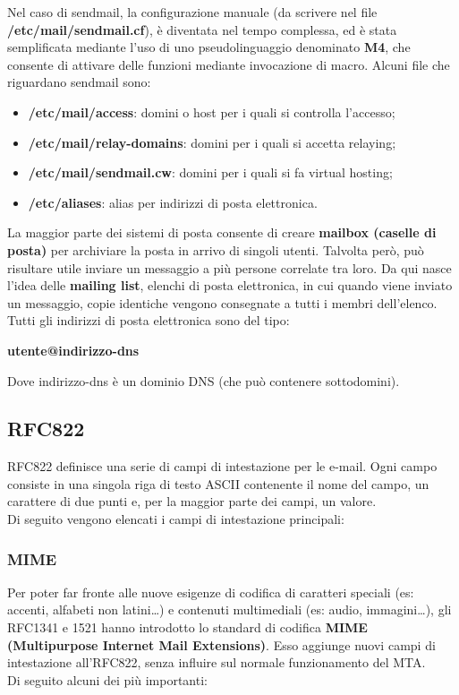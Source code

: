 Nel caso di sendmail, la configurazione manuale (da scrivere nel file
\textbf{/etc/mail/sendmail.cf}), è diventata nel tempo complessa, ed è stata semplificata
mediante l’uso di uno pseudolinguaggio denominato \textbf{M4}, che consente di attivare delle
funzioni mediante invocazione di macro. Alcuni file che riguardano sendmail sono:
\begin{itemize}
    \item \textbf{/etc/mail/access}: domini o host per i quali si controlla l’accesso;
    \item \textbf{/etc/mail/relay-domains}: domini per i quali si accetta relaying;
    \item \textbf{/etc/mail/sendmail.cw}: domini per i quali si fa virtual hosting;
    \item \textbf{/etc/aliases}: alias per indirizzi di posta elettronica.
\end{itemize}

La maggior parte dei sistemi di posta consente di creare \textbf{mailbox (caselle di posta)} per
archiviare la posta in arrivo di singoli utenti. Talvolta però, può risultare utile inviare un
messaggio a più persone correlate tra loro. Da qui nasce l’idea delle \textbf{mailing list}, elenchi di
posta elettronica, in cui quando viene inviato un messaggio, copie identiche vengono
consegnate a tutti i membri dell’elenco. Tutti gli indirizzi di posta elettronica sono del tipo:
\begin{center}
    \textbf{utente@indirizzo-dns}
\end{center}
Dove indirizzo-dns è un dominio DNS (che può contenere sottodomini).
    \subsection{RFC822}
    RFC822 definisce una serie di campi di intestazione per le e-mail. Ogni campo consiste in una
    singola riga di testo ASCII contenente il nome del campo, un carattere di due punti e, per la
    maggior parte dei campi, un valore.\\
    Di seguito vengono elencati i campi di intestazione principali:

        \subsubsection{MIME}
        Per poter far fronte alle nuove esigenze di codifica di caratteri speciali (es: accenti, alfabeti non
        latini…) e contenuti multimediali (es: audio, immagini…), gli RFC1341 e 1521 hanno introdotto
        lo standard di codifica \textbf{MIME (Multipurpose Internet Mail Extensions)}. Esso aggiunge nuovi
        campi di intestazione all’RFC822, senza influire sul normale funzionamento del MTA.\\
        Di seguito alcuni dei più importanti:


